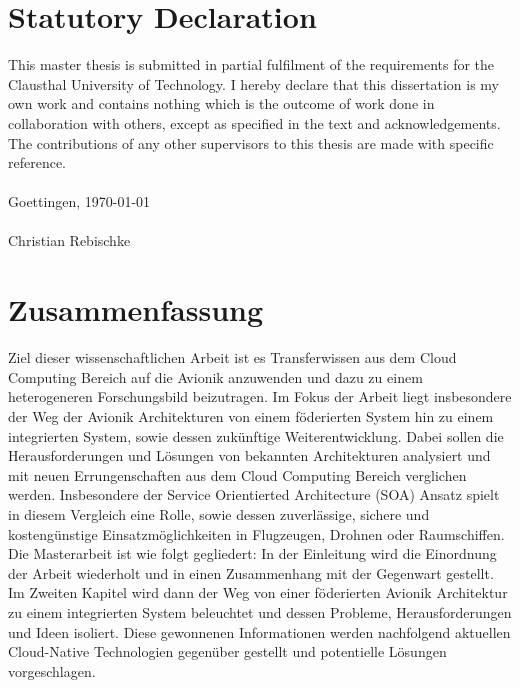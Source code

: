 \documentclass[titlepage]{report}
\begin{document}
\chapter*{Statutory Declaration}
This master thesis is submitted in partial fulfilment of the requirements for the Clausthal
University of Technology. I hereby declare that this dissertation is my own work and
contains nothing which is the outcome of work done in collaboration with others,
except as specified in the text and acknowledgements. The contributions of any other
supervisors to this thesis are made with specific reference.
\\
\\
Goettingen, \today
\\
\\
Christian Rebischke
\chapter*{Zusammenfassung}
Ziel dieser wissenschaftlichen Arbeit ist es Transferwissen aus dem Cloud Computing Bereich auf die Avionik
anzuwenden und dazu zu einem heterogeneren Forschungsbild beizutragen. Im Fokus der Arbeit liegt insbesondere
der Weg der Avionik Architekturen von einem föderierten System hin zu einem integrierten System, sowie dessen
zukünftige Weiterentwicklung. Dabei sollen die Herausforderungen und Lösungen von bekannten Architekturen
analysiert und mit neuen Errungenschaften aus dem Cloud Computing Bereich verglichen werden. Insbesondere
der Service Orientierted Architecture (SOA) Ansatz spielt in diesem Vergleich eine Rolle, sowie dessen
zuverlässige, sichere und kostengünstige Einsatzmöglichkeiten in Flugzeugen, Drohnen oder Raumschiffen.
Die Masterarbeit ist wie folgt gegliedert: In der Einleitung wird die Einordnung der Arbeit wiederholt
und in einen Zusammenhang mit der Gegenwart gestellt. Im Zweiten Kapitel wird dann der Weg von einer föderierten
Avionik Architektur zu einem integrierten System beleuchtet und dessen Probleme, Herausforderungen
und Ideen isoliert. Diese gewonnenen Informationen werden nachfolgend aktuellen Cloud-Native Technologien
gegenüber gestellt und potentielle Lösungen vorgeschlagen.
\end{document}
